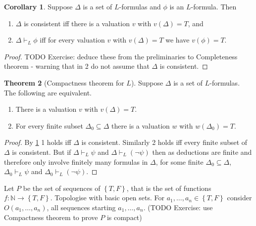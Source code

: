 \documentclass{article}
\newcommand{\N}{\mathbb{N}}
\newcommand{\rb}[1]{\left( #1 \right)}
\newcommand{\cb}[1]{\left\{ #1 \right\}}
\newcommand{\notb}[1]{\rb{\neg #1}}
\theoremstyle{definition}\newtheorem{definition}{Definition}[subsection]
\theoremstyle{definition}\newtheorem{remark}[definition]{Remark}
\theoremstyle{definition}\newtheorem*{example}{Example}
\theoremstyle{definition}\newtheorem*{note}{Note}
\newtheorem{theorem}[definition]{Theorem}
\newtheorem{corollary}[definition]{Corollary}
\begin{document}
\begin{corollary}
\label{cor:1.3.12}
Suppose $ \Delta $ is a set of $ L $-formulas and $ \phi $ is an $ L $-formula. Then
\begin{enumerate}
\item $ \Delta $ is consistent iff there is a valuation $ v $ with $ v\rb{\Delta} = T $, and
\item $ \Delta \vdash_L \phi $ iff for every valuation $ v $ with $ v\rb{\Delta} = T $ we have $ v\rb{\phi} = T $.
\end{enumerate}
\end{corollary}

\begin{proof}
TODO Exercise: deduce these from the preliminaries to Completeness theorem - warning that in 2 do not assume that $ \Delta $ is consistent.
\end{proof}

\begin{theorem}[Compactness theorem for $ L $]
Suppose $ \Delta $ is a set of $ L $-formulas. The following are equivalent.
\begin{enumerate}
\item There is a valuation $ v $ with $ v\rb{\Delta} = T $.
\item For every finite subset $ \Delta_0 \subseteq \Delta $ there is a valuation $ w $ with $ w\rb{\Delta_0} = T $.
\end{enumerate}
\end{theorem}

\begin{proof}
By \ref{cor:1.3.12} 1 holds iff $ \Delta $ is consistent. Similarly 2 holds iff every finite subset of $ \Delta $ is consistent. But if $ \Delta \vdash_L \psi $ and $ \Delta \vdash_L \notb{\psi} $ then as deductions are finite and therefore only involve finitely many formulas in $ \Delta $, for some finite $ \Delta_0 \subseteq \Delta $, $ \Delta_0 \vdash_L \psi $ and $ \Delta_0 \vdash_L \notb{\psi} $.
\end{proof}

Let $ P $ be the set of sequences of $ \cb{T, F} $, that is the set of functions $ f : \N \to \cb{T, F} $. Topologise with basic open sets. For $ a_1, \dots, a_n \in \cb{T, F} $ consider $ O\rb{a_1, \dots, a_n} $, all sequences starting $ a_1, \dots, a_n $. (TODO Exercise: use Compactness theorem to prove $ P $ is compact)

\end{document}
